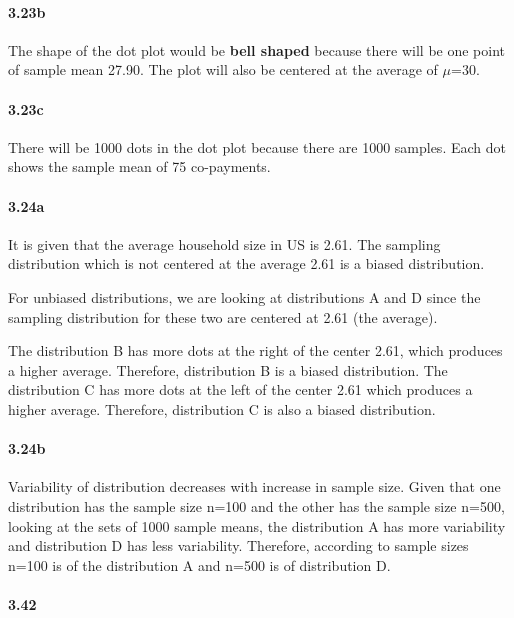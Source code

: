 \documentclass[
]{article}
\begin{document}
\hypertarget{b-1}{%
\paragraph{3.23b}\label{b-1}}

The shape of the dot plot would be \textbf{bell shaped} because there
will be one point of sample mean 27.90. The plot will also be centered
at the average of \(\mu\)=30.

\hypertarget{c-1}{%
\paragraph{3.23c}\label{c-1}}

There will be 1000 dots in the dot plot because there are 1000 samples.
Each dot shows the sample mean of 75 co-payments.

\hypertarget{a-2}{%
\paragraph{3.24a}\label{a-2}}

It is given that the average household size in US is 2.61. The sampling
distribution which is not centered at the average 2.61 is a biased
distribution.

For unbiased distributions, we are looking at distributions A and D
since the sampling distribution for these two are centered at 2.61 (the
average).

The distribution B has more dots at the right of the center 2.61, which
produces a higher average. Therefore, distribution B is a biased
distribution. The distribution C has more dots at the left of the center
2.61 which produces a higher average. Therefore, distribution C is also
a biased distribution.

\hypertarget{b-2}{%
\paragraph{3.24b}\label{b-2}}

Variability of distribution decreases with increase in sample size.
Given that one distribution has the sample size n=100 and the other has
the sample size n=500, looking at the sets of 1000 sample means, the
distribution A has more variability and distribution D has less
variability. Therefore, according to sample sizes n=100 is of the
distribution A and n=500 is of distribution D.

\hypertarget{section-1}{%
\paragraph{3.42}\label{section-1}}
\end{document}
